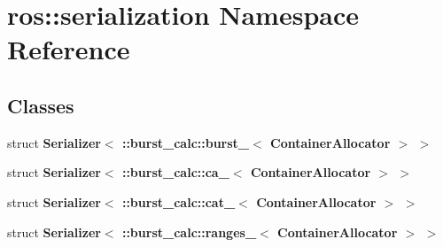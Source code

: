 \section{ros\-:\-:serialization \-Namespace \-Reference}
\label{namespaceros_1_1serialization}
\subsection*{\-Classes}
\begin{DoxyCompactItemize}
\item 
struct {\bf \-Serializer$<$ \-::burst\-\_\-calc\-::burst\-\_\-$<$ Container\-Allocator $>$ $>$}
\item 
struct {\bf \-Serializer$<$ \-::burst\-\_\-calc\-::ca\-\_\-$<$ Container\-Allocator $>$ $>$}
\item 
struct {\bf \-Serializer$<$ \-::burst\-\_\-calc\-::cat\-\_\-$<$ Container\-Allocator $>$ $>$}
\item 
struct {\bf \-Serializer$<$ \-::burst\-\_\-calc\-::ranges\-\_\-$<$ Container\-Allocator $>$ $>$}
\end{DoxyCompactItemize}
